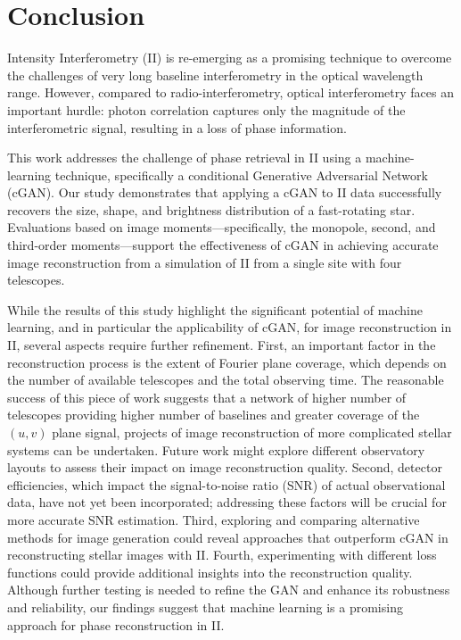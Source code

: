 \section{Conclusion}

Intensity Interferometry (II) is re-emerging as a promising technique to overcome the challenges of very long baseline interferometry in the optical wavelength range.  However, compared to radio-interferometry, optical interferometry faces an important hurdle: photon correlation captures only the magnitude of the interferometric signal, resulting in a loss of phase information.

This work addresses the challenge of phase retrieval in II using a machine-learning technique, specifically a conditional Generative Adversarial Network (cGAN). Our study demonstrates that applying a cGAN to II data successfully recovers the size, shape, and brightness distribution of a fast-rotating star. Evaluations based on image moments—specifically, the monopole, second, and third-order moments—support the effectiveness of cGAN in achieving accurate image reconstruction from a simulation of II from a single site with four telescopes.  

While the results of this study highlight the significant potential of machine learning, and in particular the applicability of cGAN, for image reconstruction in II, several aspects require further refinement. First, an important factor in the reconstruction process is the extent of Fourier plane coverage, which depends on the number of available telescopes and the total observing time. The reasonable success of this piece of work suggests that a network of higher number of telescopes providing higher number of baselines and greater coverage of the $(u,v)$ plane signal, projects of image reconstruction of more complicated stellar systems can be undertaken. Future work might explore different observatory layouts to assess their impact on image reconstruction quality.  Second, detector efficiencies, which impact the signal-to-noise ratio (SNR) of actual observational data, have not yet been incorporated; addressing these factors will be crucial for more accurate SNR estimation.  Third, exploring and comparing alternative methods for image generation could reveal approaches that outperform cGAN in reconstructing stellar images with II. Fourth, experimenting with different loss functions could provide additional insights into the reconstruction quality. Although further testing is needed to refine the GAN and enhance its robustness and reliability, our findings suggest that machine learning is a promising approach for phase reconstruction in II.
